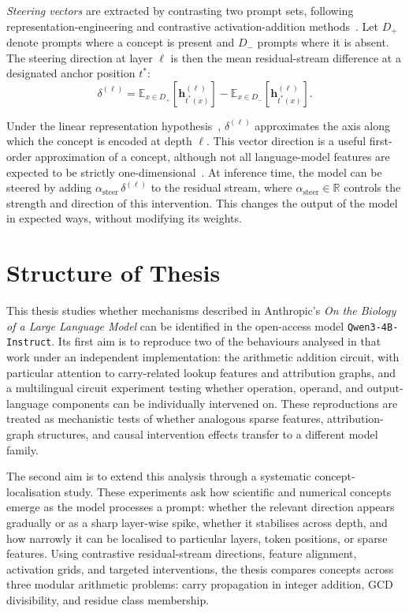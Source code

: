 \textit{Steering vectors} are extracted by contrasting two prompt sets,
following representation-engineering and contrastive activation-addition
methods~\citep{zou2023representation, rimsky2023steering}.
Let \(D_+\) denote prompts where a concept is present and \(D_-\) prompts
where it is absent. The steering direction at layer \(\ell\) is then the
mean residual-stream difference at a designated anchor position \(t^*\):
\begin{equation}
    \delta^{(\ell)} =
    \mathbb{E}_{x \in D_+}\!\left[\mathbf{h}^{(\ell)}_{t^*(x)}\right]
    -
    \mathbb{E}_{x \in D_-}\!\left[\mathbf{h}^{(\ell)}_{t^*(x)}\right].
    \label{eq:delta}
\end{equation}

Under the linear representation hypothesis~\citep{park2023linear}, $\delta^{(\ell)}$
approximates the axis along which the concept is encoded at depth $\ell$. This
vector direction is a useful first-order approximation of a concept, although not all language-model
features are expected to be strictly one-dimensional~\citep{engels2024notall}. At inference
time, the model can be steered by adding $\alpha_{\mathrm{steer}}\,\delta^{(\ell)}$ to
the residual stream, where $\alpha_{\mathrm{steer}} \in \mathbb{R}$ controls the strength
and direction of this intervention. This changes the output of the model in expected ways,
without modifying its weights.

\section{Structure of Thesis}

This thesis studies whether mechanisms described in Anthropic's 
\textit{On the Biology of a Large Language Model} can be identified in the open-access
 model \texttt{Qwen3-4B-Instruct}. Its first aim is to reproduce two of the 
 behaviours analysed in that work under an independent implementation: the 
 arithmetic addition circuit, with particular attention to carry-related lookup 
 features and attribution graphs, and a multilingual circuit experiment testing 
 whether operation, operand, and output-language components can be individually 
 intervened on. These reproductions are treated as mechanistic tests of whether 
 analogous sparse features, attribution-graph structures, and causal intervention 
 effects transfer to a different model family.

The second aim is to extend this analysis through a systematic concept-localisation
 study. These experiments ask how scientific and numerical concepts emerge as the 
 model processes a prompt: whether the relevant direction appears gradually or as 
 a sharp layer-wise spike, whether it stabilises across depth, and how narrowly it
  can be localised to particular layers, token positions, or sparse features. Using
   contrastive residual-stream directions, feature alignment, activation grids, and 
   targeted interventions, the thesis compares concepts across three modular 
   arithmetic problems: carry propagation in integer addition, GCD divisibility,
    and residue class membership.

